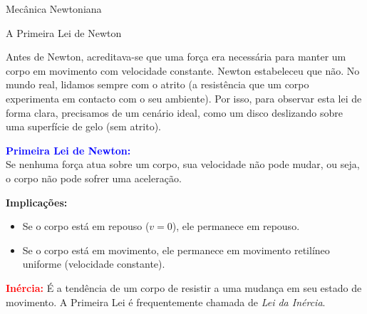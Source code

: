 \documentclass{beamer}
\begin{document}
\begin{frame}{Mecânica Newtoniana}
		
	\end{frame}
	
	\begin{frame}{A Primeira Lei de Newton}
		\footnotesize
		
		Antes de Newton, acreditava-se que uma força era necessária para manter um corpo em movimento com velocidade constante. Newton estabeleceu que não. No mundo real, lidamos sempre com o atrito (a resistência que um corpo experimenta em contacto com o seu ambiente). Por isso, para observar esta lei de forma clara, precisamos de um cenário ideal, como um disco deslizando sobre uma superfície de gelo (sem atrito).
		
		\vspace{0.3cm}
		\textcolor{blue}{\textbf{Primeira Lei de Newton:}} \\
		Se nenhuma força atua sobre um corpo, sua velocidade não pode mudar, ou seja, o corpo não pode sofrer uma aceleração.
		
		\vspace{0.3cm}
		\textbf{Implicações:}
		\begin{itemize}
			\item Se o corpo está em repouso ($v = 0$), ele permanece em repouso.
			\item Se o corpo está em movimento, ele permanece em movimento retilíneo uniforme (velocidade constante).
		\end{itemize}
		
		\vspace{0.4cm}
		\textcolor{red}{\textbf{Inércia:}} É a tendência de um corpo de resistir a uma mudança em seu estado de movimento. A Primeira Lei é frequentemente chamada de \textit{Lei da Inércia}.
		
	\end{frame}
	
\end{document}
